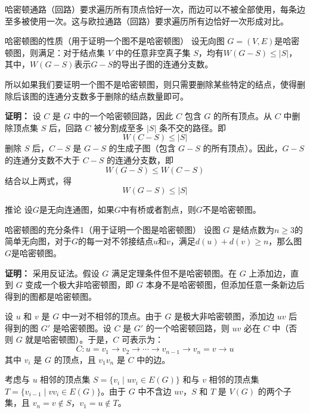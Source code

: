 哈密顿通路（回路）要求遍历所有顶点恰好一次，而边可以不被全部使用，每条边至多被使用一次。这与欧拉通路（回路）要求遍历所有边恰好一次形成对比。
\begin{theorem}{哈密顿图的性质（用于证明一个图不是哈密顿图）}{}
    设无向图 $G=(V,E)$是哈密顿图，则满足：对于结点集 $V$ 中的任意非空真子集 $S$，均有$W(G-S)\leqslant |S|$，其中，$W(G-S)$表示$G-S$的导出子图的连通分支数。

    所以如果我们要证明一个图不是哈密顿图，则只需要删除某些特定的结点，使得删除后该图的连通分支数多于删除的结点数量即可。
\end{theorem}
\textbf{证明：}
    设 $C$ 是 $G$ 中的一个哈密顿回路，因此 $C$ 包含 $G$ 的所有顶点。从 $C$ 中删除顶点集 $S$ 后，回路 $C$ 被分割成至多 $|S|$ 条不交的路径。即
    \[
    W(C - S) \leqslant |S|
    \]
删除 $S$ 后，$C - S$ 是 $G - S$ 的生成子图（包含 $G - S$ 的所有顶点）。因此，$G - S$ 的连通分支数不大于 $C - S$ 的连通分支数，即
    \[
    W(G - S) \leqslant W(C - S)
    \]
    结合以上两式，得
    \[
    W(G - S) \leqslant |S|
    \]
\begin{example}{推论}{}
    设$G$是无向连通图，如果$G$中有桥或者割点，则$G$不是哈密顿图。
\end{example}
\begin{theorem}{哈密顿图的充分条件1（用于证明一个图是哈密顿图）}{}
设图 $G$ 是结点数为$n\geqslant3$的简单无向图，对于$G$的每一对不邻接结点$u$和$v$，满足$d(u)+d(v)\geqslant n$，那么图$G$是哈密顿图。
\end{theorem}
\textbf{证明：}
采用反证法。假设 $G$ 满足定理条件但不是哈密顿图。在 $G$ 上添加边，直到 $G$ 变成一个极大非哈密顿图，即 $G$ 本身不是哈密顿图，但添加任意一条新边后得到的图都是哈密顿图。

设 $u$ 和 $v$ 是 $G$ 中一对不相邻的顶点。由于 $G$ 是极大非哈密顿图，添加边 $uv$ 后得到的图 $G'$ 是哈密顿图。设 $C$ 是 $G'$ 的一个哈密顿回路，则 $uv$ 必在 $C$ 中（否则 $G$ 就是哈密顿图）。于是，$C$ 可表示为：
\[
C: u = v_1 \to v_2 \to \cdots \to v_{n-1} \to v_n = v \to u
\]
其中 $v_i$ 是 $G$ 的顶点，且 $v_1 v_n$ 是 $C$ 中的边。

考虑与 $u$ 相邻的顶点集 $S = \{v_i \mid uv_{i} \in E(G)\}$ 和与 $v$ 相邻的顶点集 $T = \{v_{i-1} \mid v v_i \in E(G)\}$。由于 $G$ 中不含边 $uv$，$S$ 和 $T$ 是 $V(G)$ 的两个子集，且 $v_n = v \notin S$，$v_1 = u \notin T$。

